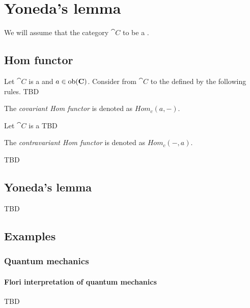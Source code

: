 \chapter{Yoneda's lemma}
\label{sec:yoneda}
We will assume that the category $\cat{C}$ to be a
.
\section{Hom functor}

\begin{definition}
\label{def:cov_hom_functor}
Let $\cat{C}$ is a  and $a \in
\mathrm{ob}(\mathbf{C})$. Consider  from $\cat{C}$ to the
 defined by the following rules.  
TBD

The \textit{covariant Hom functor} is denoted as $Hom_c(a, -)$.
\end{definition}

\begin{definition}
\label{def:con_hom_functor}
Let $\cat{C}$ is a 
TBD

The \textit{contravariant Hom functor} is denoted as $Hom_c(-, a)$.
\end{definition}


TBD

\section{Yoneda's lemma}

TBD

\section{Examples}

\subsection{Quantum mechanics}

\subsubsection{Flori interpretation of quantum mechanics}
TBD

